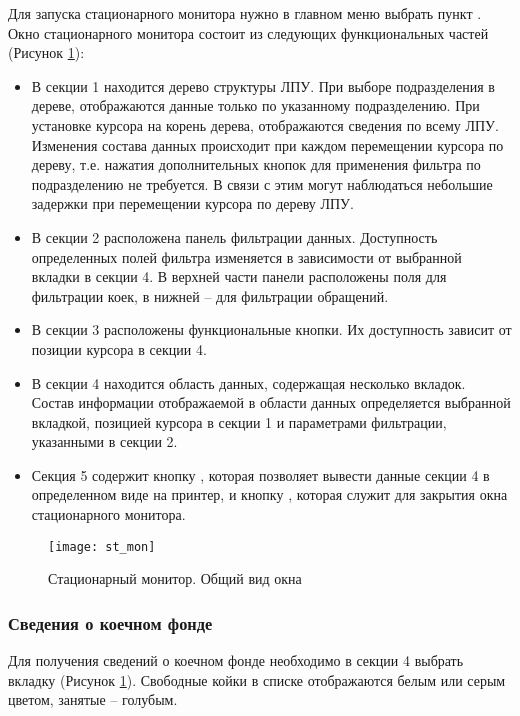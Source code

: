 Для запуска стационарного монитора нужно в главном меню выбрать пункт . Окно стационарного монитора состоит из следующих функциональных частей (Рисунок \ref{img_st_mon}):
\begin{itemize}
 \item В секции 1 находится дерево структуры ЛПУ. При выборе подразделения в дереве, отображаются данные только по указанному подразделению. При установке курсора на корень дерева, отображаются сведения по всему ЛПУ. Изменения состава данных происходит при каждом перемещении курсора по дереву, т.е. нажатия дополнительных кнопок для применения фильтра по подразделению не требуется. В связи с этим могут наблюдаться небольшие задержки при перемещении курсора по дереву ЛПУ.
 \item В секции 2 расположена панель фильтрации данных. Доступность определенных полей фильтра изменяется в зависимости от выбранной вкладки в секции 4. В верхней части панели расположены поля для фильтрации коек, в нижней – для фильтрации обращений.
 \item В секции 3 расположены функциональные кнопки. Их доступность зависит от позиции курсора в секции 4.
 \item В секции 4 находится область данных, содержащая несколько вкладок. Состав информации отображаемой в области данных определяется выбранной вкладкой, позицией курсора в секции 1 и параметрами фильтрации, указанными в секции 2.
 \item Секция 5 содержит кнопку , которая позволяет вывести данные секции 4 в определенном виде на принтер, и кнопку , которая служит для закрытия окна стационарного монитора.
\end{itemize}

\begin{figure}[ht]\centering
   \texttt{[image: st\_mon]}
   \caption{Стационарный монитор. Общий вид окна}
   \label{img_st_mon}
\end{figure}

\subsubsection{Сведения о коечном фонде}

Для получения сведений о коечном фонде необходимо в секции 4 выбрать вкладку  (Рисунок \ref{img_st_mon}). Свободные койки в списке отображаются белым или серым цветом, занятые – голубым.

